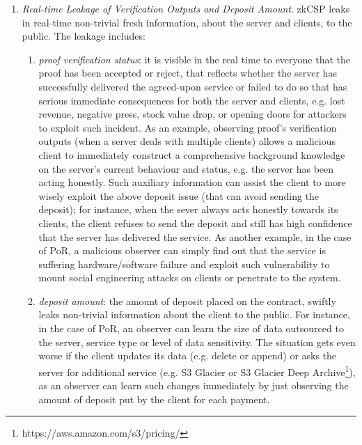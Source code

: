 \begin{enumerate}
\item\textit{Real-time Leakage of Verification Outputs and Deposit Amount}. zkCSP leaks in real-time non-trivial fresh information,  about  the server and clients, to the public. The leakage includes:
\begin{enumerate}
 \item\textit{proof verification status}: it is visible in the real time to everyone that the proof has been accepted or reject, that reflects whether  the server has successfully delivered the agreed-upon service or failed to do so that has serious immediate consequences for both the server and clients, e.g. lost revenue, negative press, stock value drop, or opening doors for attackers to exploit such incident. As an example, observing  proof's verification outputs (when a server deals with multiple clients) allows a malicious client to immediately construct a comprehensive background knowledge on the server's current behaviour and status, e.g. the server has been  acting honestly.  Such auxiliary information can assist the  client to more wisely exploit the above deposit issue (that can avoid sending the deposit); for instance, when the sever always acts honestly towards its clients, the client refuses to send the deposit and still  has  high confidence that the server has delivered the service. As another example, in the case of PoR, a malicious observer can  simply find out that the service is suffering hardware/software failure and exploit such vulnerability to  mount   social engineering attacks on clients or penetrate to the system. 

 
\item \textit{deposit amount}: the amount of deposit placed on the contract,  swiftly leaks non-trivial  information about the client to the public. For instance, in the case of PoR, an observer can learn the size of data outsourced to the server, service type or level of data sensitivity. The situation gets even worse if the client updates its data (e.g. delete or append) or asks the server for additional service (e.g. S3 Glacier or S3 Glacier Deep Archive\footnote{https://aws.amazon.com/s3/pricing/}), as an observer can learn such changes immediately by just observing the amount of deposit put by the client for each payment.  





\end{enumerate}
\end{enumerate}
